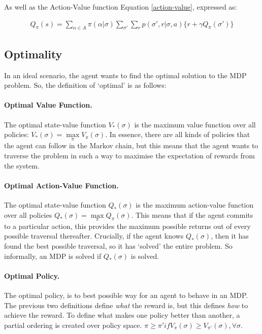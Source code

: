 \documentclass[ %
                    author={Ashwinder Khurana},
                supervisor={Prof Dave Cliff},
                    degree={MEng},
                     title={The Deeply Reinforced Trader},
                  subtitle={},
                      type={enterprise},
                      year={2020} ]{dissertation}
\begin{document}
{\noindent
As well as the Action-Value function Equation \ref{action-value}, expressed as:

\begin{equation}
\label{action-value-bellman}
\begin{split}
Q_\pi(s) = \sum\limits^{}_{\alpha \in A}{\pi(\alpha | \sigma)} \sum\limits^{}_{\sigma'}{\sum\limits^{}_{r}{p(\sigma' , r | \sigma, a) \{r + \gamma Q_\pi(\sigma')\}}}
\end{split}
\end{equation}
\vspace{0.5cm}

\subsection{Optimality}
\label{Optimality}

In an ideal scenario, the agent wants to find the optimal solution to the MDP problem. So, the definition of \enquote*{optimal} is as follows:

\paragraph{Optimal Value Function.} The optimal state-value function $V_*(\sigma)$ is the maximum value function over all policies: $V_*(\sigma) = \max\limits_\pi V_\pi(\sigma)$. In essence, there are all kinds of policies that the agent can follow in the Markov chain, but this means that the agent wants to traverse the problem in such a way to maximise the expectation of rewards from the system. 
 
\paragraph{Optimal Action-Value Function.} The optimal state-value function $Q_*(\sigma)$ is the maximum action-value function over all policies $Q_*(\sigma) = \max\limits_\pi Q_\pi(\sigma)$. This means that if the agent commits to a particular action, this provides the maximum possible returns out of every possible traversal thereafter. Crucially, if the agent knows $Q_*(\sigma)$, then it has found the best possible traversal, so it has \enquote*{solved} the entire problem. So informally, an MDP is solved if  $Q_*(\sigma)$ is solved.

\paragraph{Optimal Policy.} The optimal policy, is to best possible way for an agent to behave in an MDP. The previous two definitions define \textit{what} the reward is, but this defines \textit{how} to achieve the reward. To define what makes one policy better than another, a partial ordering is created over policy space. $\pi \geq \pi'  if  V_\pi(\sigma) \geq V_{\pi'}(\sigma), \forall \sigma$. 

}
\end{document}

